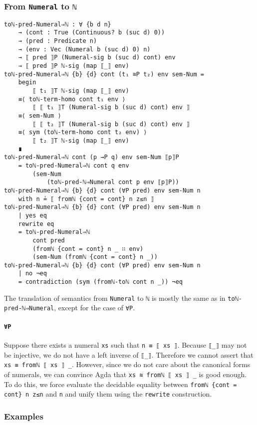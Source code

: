 \documentclass[\main/thesis.tex]{subfiles}
\begin{document}
\subsubsection{From \lstinline|Numeral| to \lstinline|ℕ|}

\begin{lstlisting}
toℕ-pred-Numeral⇒ℕ : ∀ {b d n}
    → (cont : True (Continuous? b (suc d) 0))
    → (pred : Predicate n)
    → (env : Vec (Numeral b (suc d) 0) n)
    → ⟦ pred ⟧P (Numeral-sig b (suc d) cont) env
    → ⟦ pred ⟧P ℕ-sig (map ⟦_⟧ env)
toℕ-pred-Numeral⇒ℕ {b} {d} cont (t₁ ≋P t₂) env sem-Num =
    begin
        ⟦ t₁ ⟧T ℕ-sig (map ⟦_⟧ env)
    ≡⟨ toℕ-term-homo cont t₁ env ⟩
        ⟦ ⟦ t₁ ⟧T (Numeral-sig b (suc d) cont) env ⟧
    ≡⟨ sem-Num ⟩
        ⟦ ⟦ t₂ ⟧T (Numeral-sig b (suc d) cont) env ⟧
    ≡⟨ sym (toℕ-term-homo cont t₂ env) ⟩
        ⟦ t₂ ⟧T ℕ-sig (map ⟦_⟧ env)
    ∎
toℕ-pred-Numeral⇒ℕ cont (p →P q) env sem-Num ⟦p⟧P
    = toℕ-pred-Numeral⇒ℕ cont q env
        (sem-Num
            (toℕ-pred-ℕ⇒Numeral cont p env ⟦p⟧P))
toℕ-pred-Numeral⇒ℕ {b} {d} cont (∀P pred) env sem-Num n
    with n ≟ ⟦ fromℕ {cont = cont} n z≤n ⟧
toℕ-pred-Numeral⇒ℕ {b} {d} cont (∀P pred) env sem-Num n
    | yes eq
    rewrite eq
    = toℕ-pred-Numeral⇒ℕ
        cont pred
        (fromℕ {cont = cont} n _ ∷ env)
        (sem-Num (fromℕ {cont = cont} n _))
toℕ-pred-Numeral⇒ℕ {b} {d} cont (∀P pred) env sem-Num n
    | no ¬eq
    = contradiction (sym (fromℕ-toℕ cont n _)) ¬eq
\end{lstlisting}

The translation of semantics from \lstinline|Numeral| to \lstinline|ℕ| is mostly
the same as in \lstinline|toℕ-pred-ℕ⇒Numeral|,
except for the case of \lstinline|∀P|.

\paragraph{\lstinline|∀P|}
Suppose there exists a numeral \lstinline|xs| such that \lstinline|n ≡ ⟦ xs ⟧|.
Because \lstinline|⟦_⟧| may not be injective, we do not have a left inverse of
\lstinline|⟦_⟧|.
Therefore we cannot assert that \lstinline|xs ≡ fromℕ ⟦ xs ⟧ _|.
However, since we do not care about the canonical forms of numerals,
we can convince Agda that \lstinline|xs ≋ fromℕ ⟦ xs ⟧ _| is good enough.
To do this, we force evaluate the decidable equality between
\lstinline|fromℕ {cont = cont} n z≤n| and \lstinline|n| and unify them using the
\lstinline|rewrite| construction.


\subsubsection{Examples}
\end{document}

